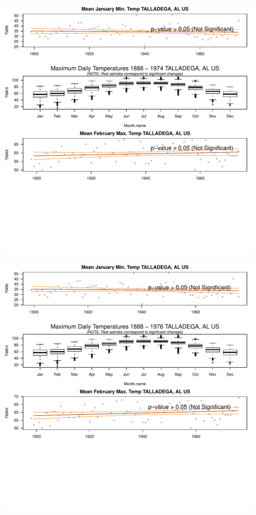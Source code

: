 \documentclass{article}\usepackage[]{graphicx}\usepackage[]{color}
\makeatletter
\def\maxwidth{ %
  \ifdim\Gin@nat@width>\linewidth
    \linewidth
  \else
    \Gin@nat@width
  \fi
}
\newenvironment{knitrout}{}{} %
\makeatother
\begin{document}
\begin{knitrout}
\includegraphics[width=\maxwidth]{figure/static_template-33} 

\includegraphics[width=\maxwidth]{figure/static_template-34} 


\end{knitrout}
\end{document}
